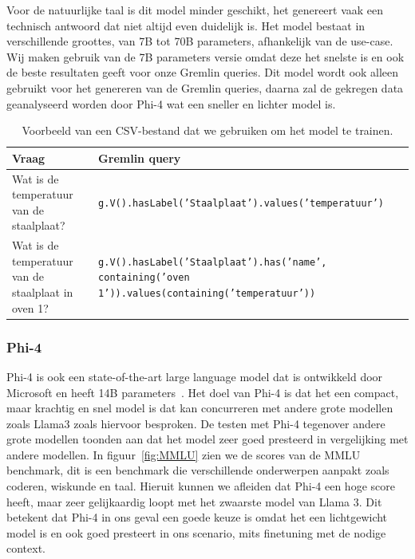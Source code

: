 Voor de natuurlijke taal is dit model minder geschikt, het genereert vaak een technisch antwoord dat niet altijd even duidelijk is.
Het model bestaat in verschillende groottes, van 7B tot 70B parameters, afhankelijk van de use-case.
Wij maken gebruik van de 7B parameters versie omdat deze het snelste is en ook de beste resultaten geeft voor onze Gremlin queries.
Dit model wordt ook alleen gebruikt voor het genereren van de Gremlin queries, daarna zal de gekregen data geanalyseerd worden door Phi-4 wat een sneller en lichter model is.

\begin{table}[H]
     \begin{tabular}{lp{}}
         \toprule
         \textbf{Vraag} & \textbf{Gremlin query} \\
         \toprule
         Wat is de temperatuur van de staalplaat? & \texttt{g.V().hasLabel('Staalplaat').values('temperatuur')} \\
         \midrule
         Wat is de temperatuur van de staalplaat in oven 1? & \texttt{g.V().hasLabel('Staalplaat').has('name', containing('oven 1')).values(containing('temperatuur'))} \\
         \bottomrule
     \end{tabular}
     \caption[Voorbeeld CSV-bestand.]{\label{tab:csv}Voorbeeld van een CSV-bestand dat we gebruiken om het model te trainen.}
 \end{table}
 
\subsubsection{Phi-4}{\label{sec:phi4}}
Phi-4 is ook een state-of-the-art large language model dat is ontwikkeld door Microsoft en heeft 14B parameters~\autocite{Kamar2024}.
Het doel van Phi-4 is dat het een compact, maar krachtig en snel model is dat kan concurreren met andere grote modellen zoals Llama3 zoals hiervoor besproken.
De testen met Phi-4 tegenover andere grote modellen toonden aan dat het model zeer goed presteerd in vergelijking met andere modellen.
In figuur~\ref{fig:MMLU} zien we de scores van de MMLU benchmark, dit is een benchmark die verschillende onderwerpen aanpakt zoals coderen, wiskunde en taal.
Hieruit kunnen we afleiden dat Phi-4 een hoge score heeft, maar zeer gelijkaardig loopt met het zwaarste model van Llama 3.
Dit betekent dat Phi-4 in ons geval een goede keuze is omdat het een lichtgewicht model is en ook goed presteert in ons scenario, mits finetuning met de nodige context.

